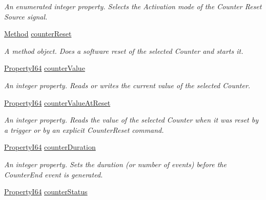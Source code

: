 \begin{DoxyCompactItemize}
\begin{DoxyCompactList}\small\item\em An enumerated integer property. Selects the Activation mode of the Counter Reset Source signal. \end{DoxyCompactList}\item 
\hyperlink{classmv_i_m_p_a_c_t_1_1acquire_1_1_method}{Method} \hyperlink{classmv_i_m_p_a_c_t_1_1acquire_1_1_gen_i_cam_1_1_counter_and_timer_control_a8bb2c2964ae66f7250a37348e5b37ec6}{counter\+Reset}
\begin{DoxyCompactList}\small\item\em A method object. Does a software reset of the selected Counter and starts it. \end{DoxyCompactList}\item 
\hyperlink{group___common_interface_ga81749b2696755513663492664a18a893}{Property\+I64} \hyperlink{classmv_i_m_p_a_c_t_1_1acquire_1_1_gen_i_cam_1_1_counter_and_timer_control_aa20aa23c911bdf08578a68724c5d52c3}{counter\+Value}
\begin{DoxyCompactList}\small\item\em An integer property. Reads or writes the current value of the selected Counter. \end{DoxyCompactList}\item 
\hyperlink{group___common_interface_ga81749b2696755513663492664a18a893}{Property\+I64} \hyperlink{classmv_i_m_p_a_c_t_1_1acquire_1_1_gen_i_cam_1_1_counter_and_timer_control_a545eb5fdfc9e07d616a39080813acfd1}{counter\+Value\+At\+Reset}
\begin{DoxyCompactList}\small\item\em An integer property. Reads the value of the selected Counter when it was reset by a trigger or by an explicit Counter\+Reset command. \end{DoxyCompactList}\item 
\hyperlink{group___common_interface_ga81749b2696755513663492664a18a893}{Property\+I64} \hyperlink{classmv_i_m_p_a_c_t_1_1acquire_1_1_gen_i_cam_1_1_counter_and_timer_control_a08e6a31eafa31c6217d3fec3de878c61}{counter\+Duration}
\begin{DoxyCompactList}\small\item\em An integer property. Sets the duration (or number of events) before the Counter\+End event is generated. \end{DoxyCompactList}\item 
\hyperlink{group___common_interface_ga81749b2696755513663492664a18a893}{Property\+I64} \hyperlink{classmv_i_m_p_a_c_t_1_1acquire_1_1_gen_i_cam_1_1_counter_and_timer_control_a45615d283c7dff07df8e05fc4679ad40}{counter\+Status}

\end{DoxyCompactItemize}
